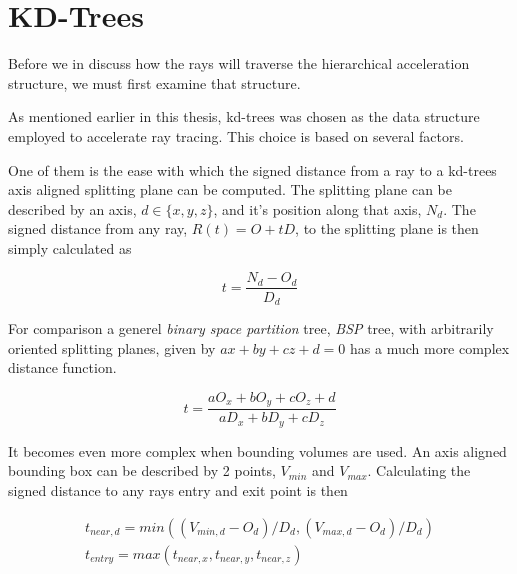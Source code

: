 \chapter{KD-Trees}\label{chp:kdTrees}




Before we in  discuss how the rays will
traverse the hierarchical acceleration structure, we must first
examine that structure.


As mentioned earlier in this thesis, kd-trees was chosen as the data
structure employed to accelerate ray tracing. This choice is based on
several factors.


One of them is the ease with which the signed distance from a ray to a
kd-trees axis aligned splitting plane can be computed. The splitting
plane can be described by an axis, $d \in \{x, y, z\}$, and it's
position along that axis, $N_d$. The signed distance from any ray,
$R(t) = O + tD$, to the splitting plane is then simply calculated as

\begin{displaymath}
  t = \frac{N_d - O_d}{D_d}
\end{displaymath}

For comparison a generel \textit{binary space partition} tree,
\textit{BSP} tree, with arbitrarily oriented splitting planes, given
by $ax + by + cz + d = 0$ has a much more complex distance function.

\begin{displaymath}
  t = \frac{a O_x + b O_y + c O_z + d}{a D_x + b D_y + c D_z}
\end{displaymath}

It becomes even more complex when bounding volumes are used. An axis
aligned bounding box can be described by 2 points, $V_{min}$ and
$V_{max}$. Calculating the signed distance to any rays entry and exit
point is then

\begin{displaymath}
  \begin{array}{l}
    t_{near,d} = min((V_{min,d} - O_d) / D_d, (V_{max,d} - O_d) / D_d)\\
    t_{entry} = max(t_{near,x}, t_{near,y}, t_{near,z})
  \end{array}
\end{displaymath}

